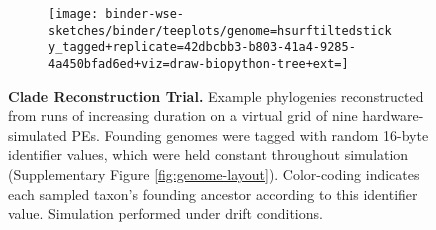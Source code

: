 \begin{figure}
\begin{subfigure}[c]{\linewidth} \centering
  \begin{minipage}[c]{0.08\linewidth} \flushright
    \caption{}
    \label{fig:tagged_250}
  \end{minipage}%
  \begin{minipage}[c]{0.92\linewidth}
    \texttt{[image: binder-wse-sketches/binder/teeplots/genome=hsurftiltedsticky\_tagged+replicate=42dbcbb3-b803-41a4-9285-4a450bfad6ed+viz=draw-biopython-tree+ext=]}
  \end{minipage}%
\end{subfigure}

\vspace{-1.5ex}

\caption{%
\textbf{Clade Reconstruction Trial.}
\footnotesize
Example phylogenies reconstructed from runs of increasing duration on a virtual grid of nine hardware-simulated PEs.
Founding genomes were tagged with random 16-byte identifier values, which were held constant throughout simulation (Supplementary Figure \ref{fig:genome-layout}).
Color-coding indicates each sampled taxon's founding ancestor according to this identifier value.
Simulation performed under drift conditions.
}
\label{fig:tagged}
\vspace{-0.2in}
\end{figure}
